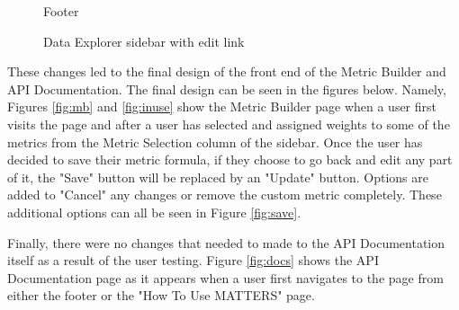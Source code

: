 			\begin{figure}[t]
				\centering
					\caption{Footer}
					\label{fig:footer}
			\end{figure}
			
			\begin{figure}[t]
				\centering
					\caption{Data Explorer sidebar with edit link}
					\label{fig:edit}
			\end{figure}
			
		These changes led to the final design of the front end of the Metric Builder 
		and API Documentation. The final design can be seen in the figures below. Namely, Figures \ref{fig:mb} and \ref{fig:inuse} show the Metric Builder page when a user first visits 
		the page and after a user has selected and assigned weights to some of the metrics from the Metric Selection column of the sidebar. Once the user has decided to save their metric formula, 
		if they choose to go back and edit any part of it, the "Save" button will be replaced by an "Update" button. Options are added to "Cancel" any changes or remove the custom metric completely. 
		These additional options can all be seen in Figure \ref{fig:save}. 
		
		Finally, there were no changes that needed to made to the API Documentation itself as a result of the user testing. 
		Figure \ref{fig:docs} shows the API Documentation page as it appears when a user first navigates to the page from either the footer or the "How To Use MATTERS" page.

